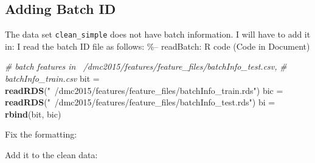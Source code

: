 \documentclass[10pt]{report}
\newenvironment{Shaded}{}{}
\newcommand{\KeywordTok}[1]{\textcolor[rgb]{0.00,0.44,0.13}{\textbf{{#1}}}}
\newcommand{\DataTypeTok}[1]{\textcolor[rgb]{0.56,0.13,0.00}{{#1}}}
\newcommand{\DecValTok}[1]{\textcolor[rgb]{0.25,0.63,0.44}{{#1}}}
\newcommand{\StringTok}[1]{\textcolor[rgb]{0.25,0.44,0.63}{{#1}}}
\newcommand{\CommentTok}[1]{\textcolor[rgb]{0.38,0.63,0.69}{\textit{{#1}}}}
\newcommand{\NormalTok}[1]{{#1}}
\begin{document}
\subsection{Adding Batch ID}\label{adding-batch-id}

The data set \verb!clean_simple! does not have batch information. I will
have to add it in: I read the batch ID file as follows: \%-- readBatch:
R code (Code in Document)

\begin{Shaded}
\begin{Highlighting}[]
\CommentTok{# batch features in ~/dmc2015/features/feature_files/batchInfo_test.csv,}
\CommentTok{# batchInfo_train.csv}
\NormalTok{bit =}\StringTok{ }\KeywordTok{readRDS}\NormalTok{(}\StringTok{"~/dmc2015/features/feature_files/batchInfo_train.rds"}\NormalTok{)}
\NormalTok{bic =}\StringTok{ }\KeywordTok{readRDS}\NormalTok{(}\StringTok{"~/dmc2015/features/feature_files/batchInfo_test.rds"}\NormalTok{)}
\NormalTok{bi =}\StringTok{ }\KeywordTok{rbind}\NormalTok{(bit, bic)}
\end{Highlighting}
\end{Shaded}

Fix the formatting:

\begin{Shaded}
\end{Shaded}

Add it to the clean data:

\begin{Shaded}
\end{Shaded}
\end{document}
